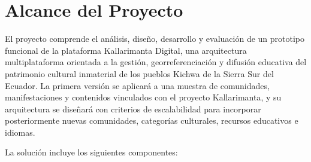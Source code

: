 \section{Alcance del Proyecto}
El proyecto comprende el análisis, diseño, desarrollo y evaluación de un prototipo funcional de la plataforma Kallarimanta Digital, una arquitectura multiplataforma orientada a la gestión, georreferenciación y difusión educativa del patrimonio cultural inmaterial de los pueblos Kichwa de la Sierra Sur del Ecuador. La primera versión se aplicará a una muestra de comunidades, manifestaciones y contenidos vinculados con el proyecto Kallarimanta, y su arquitectura se diseñará con criterios de escalabilidad para incorporar posteriormente nuevas comunidades, categorías culturales, recursos educativos e idiomas.

La solución incluye los siguientes componentes:

